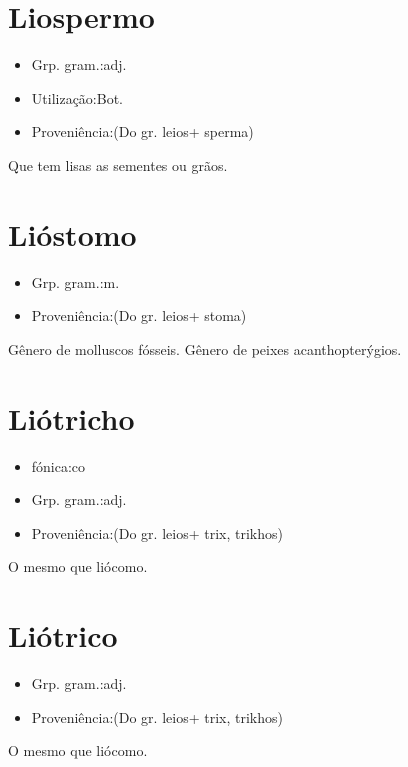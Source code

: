 \section{Liospermo}
\begin{itemize}
\item {Grp. gram.:adj.}
\end{itemize}
\begin{itemize}
\item {Utilização:Bot.}
\end{itemize}
\begin{itemize}
\item {Proveniência:(Do gr. \textunderscore leios\textunderscore  + \textunderscore sperma\textunderscore )}
\end{itemize}
Que tem lisas as sementes ou grãos.
\section{Lióstomo}
\begin{itemize}
\item {Grp. gram.:m.}
\end{itemize}
\begin{itemize}
\item {Proveniência:(Do gr. \textunderscore leios\textunderscore  + \textunderscore stoma\textunderscore )}
\end{itemize}
Gênero de molluscos fósseis.
Gênero de peixes acanthopterýgios.
\section{Liótricho}
\begin{itemize}
\item {fónica:co}
\end{itemize}
\begin{itemize}
\item {Grp. gram.:adj.}
\end{itemize}
\begin{itemize}
\item {Proveniência:(Do gr. \textunderscore leios\textunderscore  + \textunderscore trix\textunderscore , \textunderscore trikhos\textunderscore )}
\end{itemize}
O mesmo que \textunderscore liócomo\textunderscore .
\section{Liótrico}
\begin{itemize}
\item {Grp. gram.:adj.}
\end{itemize}
\begin{itemize}
\item {Proveniência:(Do gr. \textunderscore leios\textunderscore  + \textunderscore trix\textunderscore , \textunderscore trikhos\textunderscore )}
\end{itemize}
O mesmo que \textunderscore liócomo\textunderscore .
